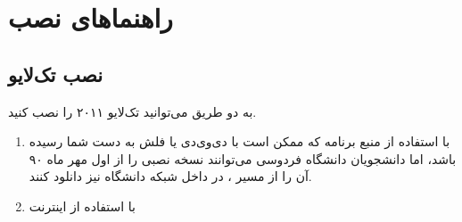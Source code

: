 \def\bs{$\backslash$}
\chapter{راهنماهای نصب}\label{c1}
\section{نصب تک‌لایو}
به دو طریق می‌توانید تک‌لایو ۲۰۱۱ را نصب کنید.
\begin{enumerate}
\item
با استفاده از منبع برنامه که ممکن است با دی‌وی‌دی یا فلش به دست شما رسیده باشد، اما دانشجویان دانشگاه فردوسی می‌توانند نسخه نصبی را از اول مهر ماه ۹۰ آن را از مسیر ، در داخل شبکه دانشگاه نیز دانلود کنند.
\item
با استفاده از اینترنت
\end{enumerate}
